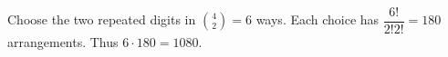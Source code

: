 Choose the two repeated digits in $\binom42=6$ ways. Each choice has $\dfrac{6!}{2!2!}=180$ arrangements. Thus $6\cdot180=\boxed{1080}$.

